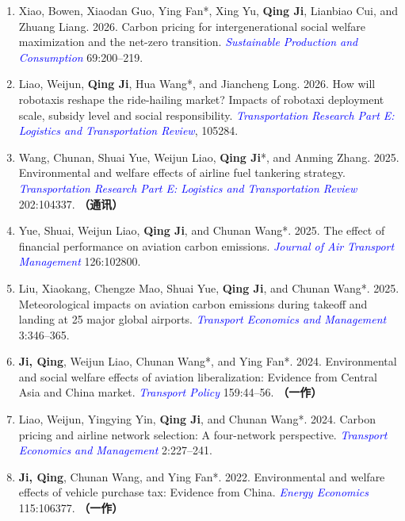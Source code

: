 \documentclass[letterpaper]{article}
\newcommand{\journal}[1]{\textcolor{blue}{\textit{#1}}}
\begin{document}
\begin{enumerate}
    \item Xiao, Bowen, Xiaodan Guo, Ying Fan*, Xing Yu, \textbf{Qing Ji}, Lianbiao Cui, and Zhuang Liang. 2026. Carbon pricing for intergenerational social welfare maximization and the net-zero transition. \journal{Sustainable Production and Consumption} 69:200--219.
    \item Liao, Weijun, \textbf{Qing Ji}, Hua Wang*, and Jiancheng Long. 2026. How will robotaxis reshape the ride-hailing market? Impacts of robotaxi deployment scale, subsidy level and social responsibility. \journal{Transportation Research Part E: Logistics and Transportation Review}, 105284.
    \item Wang, Chunan, Shuai Yue, Weijun Liao, \textbf{Qing Ji}*, and Anming Zhang. 2025. Environmental and welfare effects of airline fuel tankering strategy. \journal{Transportation Research Part E: Logistics and Transportation Review} 202:104337. \textbf{（通讯）}
    \item Yue, Shuai, Weijun Liao, \textbf{Qing Ji}, and Chunan Wang*. 2025. The effect of financial performance on aviation carbon emissions. \journal{Journal of Air Transport Management} 126:102800.
    \item Liu, Xiaokang, Chengze Mao, Shuai Yue, \textbf{Qing Ji}, and Chunan Wang*. 2025. Meteorological impacts on aviation carbon emissions during takeoff and landing at 25 major global airports. \journal{Transport Economics and Management} 3:346--365.
    \item \textbf{Ji, Qing}, Weijun Liao, Chunan Wang*, and Ying Fan*. 2024. Environmental and social welfare effects of aviation liberalization: Evidence from Central Asia and China market. \journal{Transport Policy} 159:44--56. \textbf{（一作）}
    \item Liao, Weijun, Yingying Yin, \textbf{Qing Ji}, and Chunan Wang*. 2024. Carbon pricing and airline network selection: A four-network perspective. \journal{Transport Economics and Management} 2:227--241.
    \item \textbf{Ji, Qing}, Chunan Wang, and Ying Fan*. 2022. Environmental and welfare effects of vehicle purchase tax: Evidence from China. \journal{Energy Economics} 115:106377. \textbf{（一作）}
  \end{enumerate}
\end{document}
